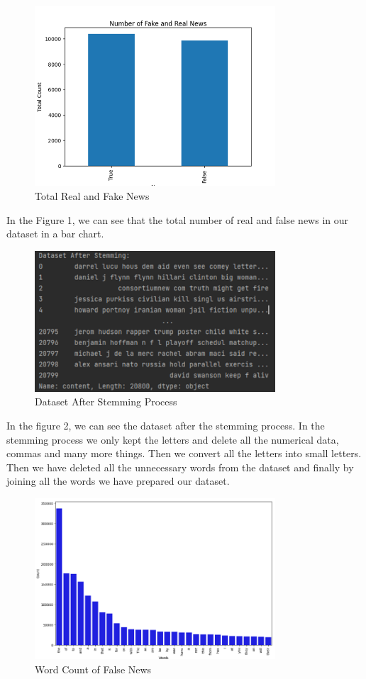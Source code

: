 \documentclass{article}
\begin{document}
    \begin{figure}[!h]
    \centering
    \includegraphics[width=0.8\textwidth]{image1.png}
    \caption{Total Real and Fake News}
    \label{fig:label}
    \end{figure}
    In the Figure 1, we can see that the total number of real and false news in our dataset in a bar chart.\break
    \begin{figure}[!h]
    \centering
    \includegraphics[width=0.8\textwidth]{image2.png}
    \caption{Dataset After Stemming Process}
    \label{fig:label}
    \end{figure}
    \break
    In the figure 2, we can see the dataset after the stemming process. In the stemming process we only kept the letters and delete all the numerical data, commas and many more things. Then we convert all the letters into small letters. Then we have deleted all the unnecessary words from the dataset and finally by joining all the words we have prepared our dataset.\break
    \begin{figure}[!h]
    \centering
    \includegraphics[width=0.8\textwidth]{image3.png}
    \caption{Word Count of False News}
    \label{fig:label}
    \end{figure}\break
\end{document}
